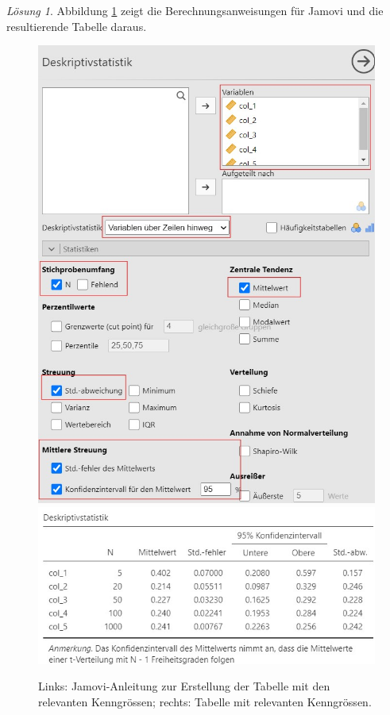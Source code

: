 \documentclass[
]{book}
\theoremstyle{definition}
\theoremstyle{definition}
\theoremstyle{definition}
\theoremstyle{definition}
\theoremstyle{remark}
\newtheorem*{solution}{Lösung}
\begin{document}
\begin{solution}

Abbildung \ref{fig:sol-ki-mean-n-vary} zeigt die Berechnungsanweisungen für Jamovi und die resultierende Tabelle daraus.

\begin{figure}

{\centering \includegraphics[width=0.5\linewidth]{figures/04-exr-stichprobengroesse-jmv-input} \includegraphics[width=0.5\linewidth]{figures/04-exr-stichprobengroesse-jmv-output} 

}

\caption{Links: Jamovi-Anleitung zur Erstellung der Tabelle mit den relevanten Kenngrössen; rechts: Tabelle mit relevanten Kenngrössen.}\label{fig:sol-ki-mean-n-vary}
\end{figure}


\end{solution}
\end{document}
